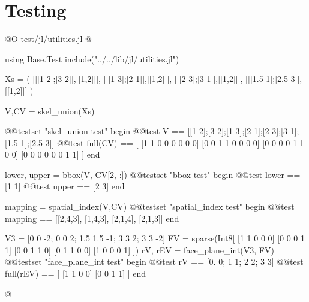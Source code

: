 \documentclass[10pt,oneside]{article}
\begin{document}
\section{Testing}
@O test/jl/utilities.jl
@{using Base.Test
include("../../lib/jl/utilities.jl")

Xs = (
    [[[1 2];[3 2]],[[1,2]]],
    [[[1 3];[2 1]],[[1,2]]],
    [[[2 3];[3 1]],[[1,2]]],
    [[[1.5 1];[2.5 3]],[[1,2]]]
)

V,CV = skel_union(Xs)

@@testset "skel_union test" begin
    @@test V == [[1 2];[3 2];[1 3];[2 1];[2 3];[3 1];[1.5 1];[2.5 3]]
    @@test full(CV) == [
        [1 1 0 0 0 0 0 0]
        [0 0 1 1 0 0 0 0]
        [0 0 0 0 1 1 0 0]
        [0 0 0 0 0 0 1 1]
    ]
end

lower, upper = bbox(V, CV[2, :])
@@testset "bbox test" begin
    @@test lower == [1 1]
    @@test upper == [2 3]
end

mapping = spatial_index(V,CV)
@@testset "spatial_index test" begin
    @@test mapping == [[2,4,3], [1,4,3], [2,1,4], [2,1,3]]
end

V3 = [0 0 -2; 0 0 2; 1.5 1.5 -1; 3 3 2; 3 3 -2]
FV = sparse(Int8[
    [1 1 0 0 0]
    [0 0 0 1 1]
    [0 0 1 1 0]
    [0 1 1 0 0]
    [1 0 0 0 1]
])
rV, rEV = face_plane_int(V3, FV)
@@testset "face_plane_int test" begin
    @@test rV == [0. 0; 1 1; 2 2; 3 3]
    @@test full(rEV) == [
        [1 1 0 0]
        [0 0 1 1]
    ]
end

@}
\end{document}
